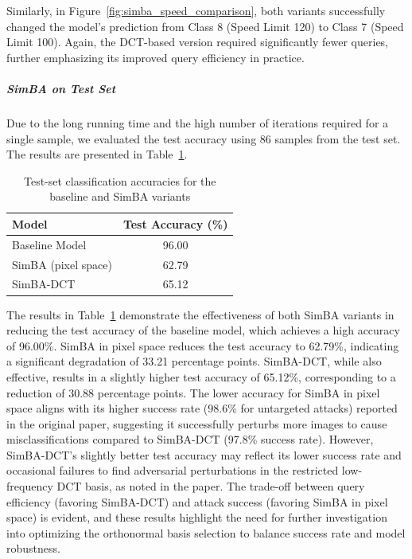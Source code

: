 \documentclass[../main.tex]{subfiles}
\begin{document}
Similarly, in Figure~\ref{fig:simba_speed_comparison}, both variants successfully changed the model's prediction from Class 8 (Speed Limit 120) to Class 7 (Speed Limit 100). Again, the DCT-based version required significantly fewer queries, further emphasizing its improved query efficiency in practice.

\subparagraph{SimBA on Test Set}

Due to the long running time and the high number of iterations required for a single sample, we evaluated the test accuracy using 86 samples from the test set. The results are presented in Table~\ref{tab:simba-accuracy-comparison}.

\begin{table}[ht]
\centering
\caption{Test-set classification accuracies for the baseline and SimBA variants}
\label{tab:simba-accuracy-comparison}
\begin{tabular}{l c}
\toprule
\textbf{Model} & \textbf{Test Accuracy (\%)} \\
\midrule
Baseline Model         & 96.00 \\
SimBA (pixel space)    & 62.79 \\
SimBA-DCT              & 65.12 \\
\bottomrule
\end{tabular}
\end{table}

The results in Table~\ref{tab:simba-accuracy-comparison} demonstrate the effectiveness of both SimBA variants in reducing the test accuracy of the baseline model, which achieves a high accuracy of 96.00\%. SimBA in pixel space reduces the test accuracy to 62.79\%, indicating a significant degradation of 33.21 percentage points. SimBA-DCT, while also effective, results in a slightly higher test accuracy of 65.12\%, corresponding to a reduction of 30.88 percentage points. The lower accuracy for SimBA in pixel space aligns with its higher success rate (98.6\% for untargeted attacks) reported in the original paper, suggesting it successfully perturbs more images to cause misclassifications compared to SimBA-DCT (97.8\% success rate). However, SimBA-DCT's slightly better test accuracy may reflect its lower success rate and occasional failures to find adversarial perturbations in the restricted low-frequency DCT basis, as noted in the paper. The trade-off between query efficiency (favoring SimBA-DCT) and attack success (favoring SimBA in pixel space) is evident, and these results highlight the need for further investigation into optimizing the orthonormal basis selection to balance success rate and model robustness.
\end{document}
